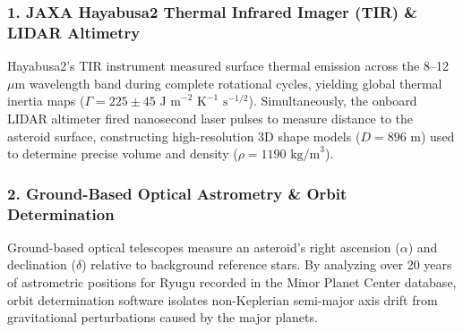 \documentclass[11pt,a4paper]{article}
\begin{document}
\subsubsection*{1. JAXA Hayabusa2 Thermal Infrared Imager (TIR) \& LIDAR Altimetry}
Hayabusa2's TIR instrument measured surface thermal emission across the 8--12 $\mu\text{m}$ wavelength band during complete rotational cycles, yielding global thermal inertia maps ($\Gamma = 225 \pm 45\text{ J m}^{-2} \text{ K}^{-1} \text{ s}^{-1/2}$). Simultaneously, the onboard LIDAR altimeter fired nanosecond laser pulses to measure distance to the asteroid surface, constructing high-resolution 3D shape models ($D = 896\text{ m}$) used to determine precise volume and density ($\rho = 1190\text{ kg/m}^3$).

\subsubsection*{2. Ground-Based Optical Astrometry \& Orbit Determination}
Ground-based optical telescopes measure an asteroid's right ascension ($\alpha$) and declination ($\delta$) relative to background reference stars. By analyzing over 20 years of astrometric positions for Ryugu recorded in the Minor Planet Center database, orbit determination software isolates non-Keplerian semi-major axis drift from gravitational perturbations caused by the major planets.
\end{document}
